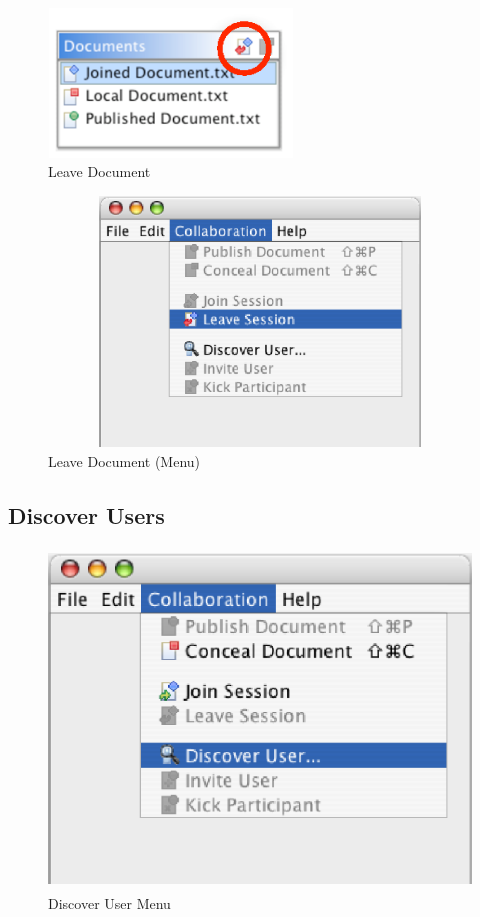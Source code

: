 \documentclass[11pt,a4paper]{article}
\begin{document}
\begin{figure}[H]
\begin{center}
  \includegraphics[height=1.56in, width=2.56in]{../images/usermanual/g_dview_leave.eps}
\caption{Leave Document}
\label{default}
\end{center}
\end{figure}

\begin{figure}[H]
\begin{center}
  \includegraphics[height=2.62in, width=6.31in]{../images/usermanual/menu_collab_leave.eps}
\caption{Leave Document (Menu)}
\label{default}
\end{center}
\end{figure}


\subsection{Discover Users}

\begin{figure}[H]
\begin{center}
  \includegraphics[height=3.56in, width=4.56in]{../images/usermanual/menu_collab_discover.eps}
\caption{Discover User Menu}
\label{default}
\end{center}
\end{figure}
\end{document}
